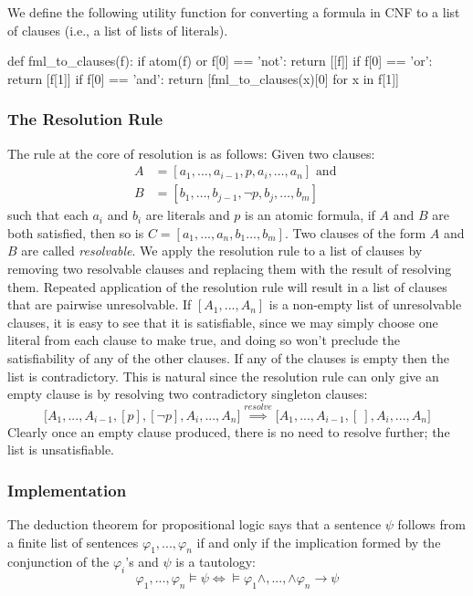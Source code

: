 \documentclass[a4paper,notitlepage]{scrartcl}
\let\phi\varphi
\begin{document}
We define the following utility function for converting a formula in CNF to
   a list of clauses (i.e., a list of lists of literals).
\begin{code}
def fml_to_clauses(f):
    if atom(f) or f[0] == 'not':
        return [[f]]
    if f[0] == 'or': 
        return [f[1]]
    if f[0] == 'and':
        return [fml_to_clauses(x)[0] for x in f[1]]
\end{code}


\subsubsection{The Resolution Rule}
The rule at the core of resolution is as follows:
Given two clauses:
\begin{align*}
A &= [a_1,\ldots,a_{i-1}, p, a_{i},\ldots,a_n]\text{ and }\\
B &= [b_1,\ldots,b_{j-1},\lnot p, b_{j}, \ldots, b_m]
\end{align*}
such that each $a_i$ and $b_i$ are literals and $p$ is an atomic formula,
if $A$ and $B$ are both satisfied, then so 
   is $C = [a_1,..., a_n, b_1..., b_m]$.
Two clauses of the form $A$ and $B$ are called \emph{resolvable}.
We apply the resolution rule to a list of clauses by removing two resolvable
   clauses and replacing them with the result of resolving them.
Repeated application of the resolution rule will result in a list of clauses
   that are pairwise unresolvable.
If $[A_1,...,A_n]$ is a non-empty list of unresolvable clauses, it is easy 
   to see that it is satisfiable, since we may simply choose one literal 
   from each clause to make true, and doing so won't preclude the 
   satisfiability of any of the other clauses.
If any of the clauses is empty then the list is contradictory.
This is natural since the resolution rule can only give an
   empty clause is by resolving two contradictory singleton clauses:
\[
\big[A_1,..., A_{i-1}, [p], [\lnot p], A_i,..., A_n\big] \overset{resolve}\implies
\big[A_1,..., A_{i-1}, [\ ], A_i,..., A_n\big]
\]
Clearly once an empty clause produced, there is no need to resolve further;
   the list is unsatisfiable.

\subsubsection{Implementation}

The deduction theorem for propositional logic says that a sentence $\psi$
   follows from a finite list of sentences $\phi_1,...,\phi_n$ if and only
   if the implication formed by the conjunction of the $\phi_i$'s and $\psi$
   is a tautology:
\[
\phi_1,...,\phi_n\models\psi \iff \models\phi_1\land,...,\land\phi_n
   \rightarrow\psi
\]
\end{document}

